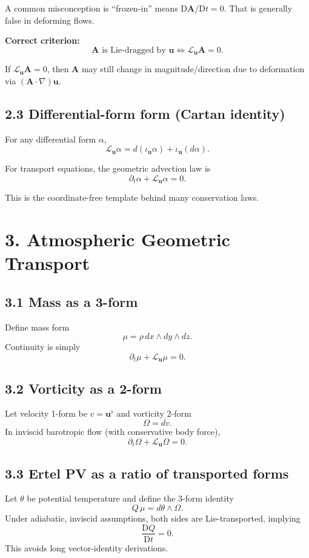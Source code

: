\documentclass[11pt]{article}
\newcommand{\Lie}{\mathcal{L}}
\newcommand{\DD}{\mathrm{D}}
\begin{document}
A common misconception is ``frozen-in'' means $\DD\mathbf{A}/\DD t=0$. That is generally false in deforming flows.

\textbf{Correct criterion:}
\[
\mathbf{A}\text{ is Lie-dragged by }\mathbf{u}
\iff \Lie_{\mathbf{u}}\mathbf{A}=0.
\]

If $\Lie_{\mathbf{u}}\mathbf{A}=0$, then $\mathbf{A}$ may still change in magnitude/direction due to deformation via $(\mathbf{A}\cdot\nabla)\mathbf{u}$.

\subsection*{2.3 Differential-form form (Cartan identity)}

For any differential form $\alpha$,
\[
\Lie_{\mathbf{u}}\alpha = d(\iota_{\mathbf{u}}\alpha) + \iota_{\mathbf{u}}(d\alpha).
\]

For transport equations, the geometric advection law is
\[
\partial_t \alpha + \Lie_{\mathbf{u}}\alpha = 0.
\]

This is the coordinate-free template behind many conservation laws.

\section*{3. Atmospheric Geometric Transport}

\subsection*{3.1 Mass as a 3-form}

Define mass form
\[
\mu = \rho\,dx\wedge dy\wedge dz.
\]
Continuity is simply
\[
\partial_t \mu + \Lie_{\mathbf{u}}\mu = 0.
\]

\subsection*{3.2 Vorticity as a 2-form}

Let velocity 1-form be $v=\mathbf{u}^{\flat}$ and vorticity 2-form
\[
\Omega = dv.
\]
In inviscid barotropic flow (with conservative body force),
\[
\partial_t\Omega + \Lie_{\mathbf{u}}\Omega = 0.
\]

\subsection*{3.3 Ertel PV as a ratio of transported forms}

Let $\theta$ be potential temperature and define the 3-form identity
\[
Q\,\mu = d\theta \wedge \Omega.
\]
Under adiabatic, inviscid assumptions, both sides are Lie-transported, implying
\[
\frac{\DD Q}{\DD t}=0.
\]
This avoids long vector-identity derivations.
\end{document}

